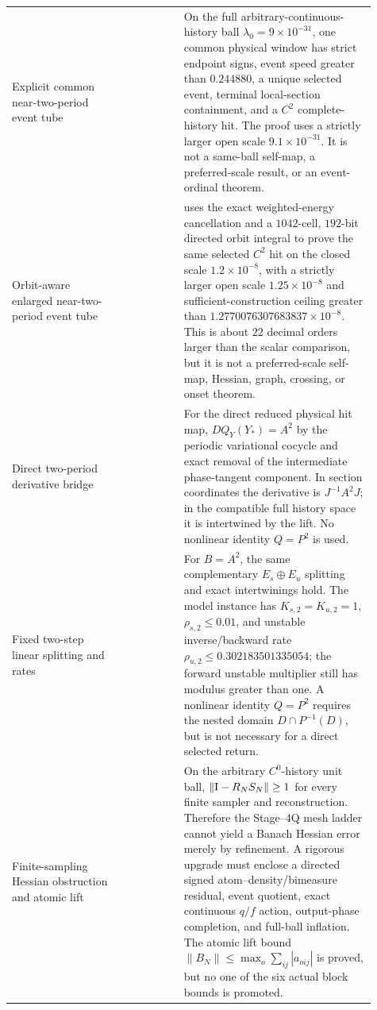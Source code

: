 \begin{longtable}{@{}L{0.28\linewidth}L{0.15\linewidth}L{0.48\linewidth}@{}}
Explicit common near-two-period event tube
& 
& On the full arbitrary-continuous-history ball
  \(\lambda_0=9\times10^{-31}\), one common physical window has strict
  endpoint signs, event speed greater than \(0.244880\), a unique selected
  event, terminal local-section containment, and a \(C^2\) complete-history
  hit.  The proof uses a strictly larger open scale
  \(9.1\times10^{-31}\).  It is not a same-ball self-map, a preferred-scale
  result, or an event-ordinal theorem.\\

Orbit-aware enlarged near-two-period event tube
& 
&  uses the exact weighted-energy
  cancellation and a \(1042\)-cell, \(192\)-bit directed orbit integral to
  prove the same selected \(C^2\) hit on the closed scale
  \(1.2\times10^{-8}\), with a strictly larger open scale
  \(1.25\times10^{-8}\) and sufficient-construction ceiling greater than
  \(1.2770076307683837\times10^{-8}\).  This is about \(22\) decimal orders
  larger than the scalar comparison, but it is not a preferred-scale
  self-map, Hessian, graph, crossing, or onset theorem.\\

Direct two-period derivative bridge
& 
& For the direct reduced physical hit map,
  \(DQ_Y(Y_*)=A^2\) by the periodic variational cocycle and exact removal of
  the intermediate phase-tangent component.  In section coordinates the
  derivative is \(J^{-1}A^2J\); in the compatible full history space it is
  intertwined by the lift.  No nonlinear identity \(Q=P^2\) is used.\\

Fixed two-step linear splitting and rates
& 
& For \(B=A^2\), the same complementary \(E_s\oplus E_u\) splitting and
  exact intertwinings hold.  The model instance has
  \(K_{s,2}=K_{u,2}=1\), \(\rho_{s,2}\le0.01\), and unstable
  inverse/backward rate
  \(\rho_{u,2}\le0.302183501335054\); the forward unstable multiplier still
  has modulus greater than one.  A nonlinear identity \(Q=P^2\) requires the
  nested domain \(D\cap P^{-1}(D)\), but is not necessary for a direct
  selected return.\\

Finite-sampling Hessian obstruction and atomic lift
& 
& On the arbitrary \(C^0\)-history unit ball,
  \(\|\mathrm I-R_NS_N\|\ge1\) for every finite sampler and reconstruction.
  Therefore the Stage--4Q mesh ladder cannot yield a Banach Hessian error
  merely by refinement.  A rigorous upgrade must enclose a directed signed
  atom--density/bimeasure residual, event quotient, exact continuous
  \(q/f\) action, output-phase completion, and full-ball inflation.  The
  atomic lift bound \(\|B_N\|\le\max_o\sum_{ij}|a_{oij}|\) is proved, but no
  one of the six actual block bounds is promoted.\\


\end{longtable}
